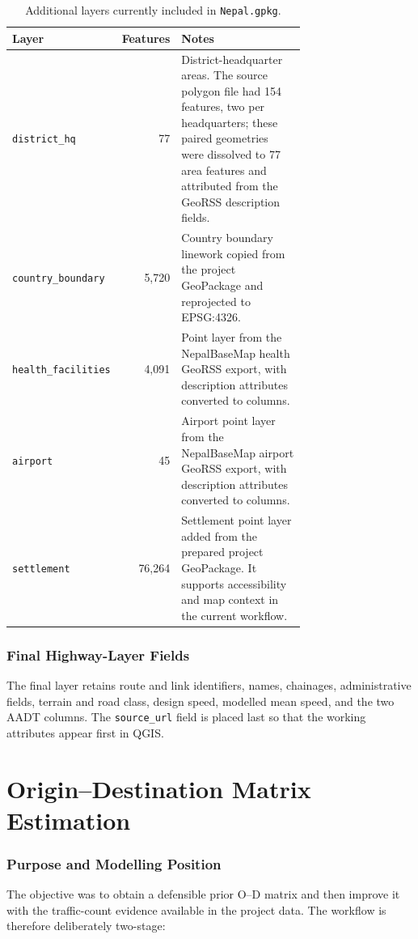 \documentclass[11pt,a4paper]{article}
\newcommand{\od}{O--D}
\begin{document}
\begin{table}[H]
\centering
\caption{Additional layers currently included in \texttt{Nepal.gpkg}.}
\begin{tabularx}{\linewidth}{p{0.24\linewidth} rp{0.48\linewidth}}
\toprule
\textbf{Layer} & \textbf{Features} & \textbf{Notes} \\
\midrule
\texttt{district\_hq} & 77 & District-headquarter areas. The source polygon
file had 154 features, two per headquarters; these paired geometries were
dissolved to 77 area features and attributed from the GeoRSS description
fields. \\
\texttt{country\_boundary} & 5,720 & Country boundary linework copied from the
project GeoPackage and reprojected to EPSG:4326. \\
\texttt{health\_facilities} & 4,091 & Point layer from the NepalBaseMap health
GeoRSS export, with description attributes converted to columns. \\
\texttt{airport} & 45 & Airport point layer from the NepalBaseMap airport
GeoRSS export, with description attributes converted to columns. \\
\texttt{settlement} & 76,264 & Settlement point layer added from the prepared
project GeoPackage. It supports accessibility and map context in the current
workflow. \\
\bottomrule
\end{tabularx}
\end{table}

\section{Final Highway-Layer Fields}

The final layer retains route and link identifiers, names, chainages,
administrative fields, terrain and road class, design speed, modelled mean
speed, and the two AADT columns. The \texttt{source\_url} field is placed last
so that the working attributes appear first in QGIS.

\part{Origin--Destination Matrix Estimation}

\section{Purpose and Modelling Position}

The objective was to obtain a defensible prior \od{} matrix and then improve it
with the traffic-count evidence available in the project data. The workflow is
therefore deliberately two-stage:
\end{document}
